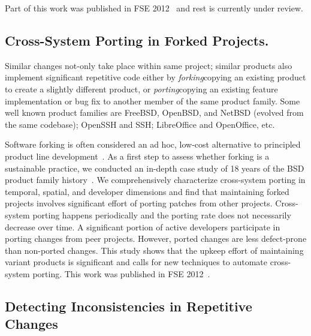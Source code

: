 \documentclass[a4paper, 11pt]{article}
\begin{document}
\begin{small}
\begin{itemize}
\end{itemize}

Part of this work was published in FSE 2012~\cite{Ray2012:RCP, Ray2012} and rest is currently under review.


\subsection*{\small Cross-System Porting in Forked Projects.}

Similar changes not-only take place within same project; similar products also implement significant repetitive code 
either by {\it forking}\textemdash copying an existing product to create a slightly different product, or 
{\it porting}\textemdash copying an existing feature implementation or bug fix to another member of the same product family. 
Some well known product families are FreeBSD, OpenBSD, and NetBSD (evolved from the same codebase);
OpenSSH and SSH; LibreOffice and OpenOffice, etc. 

Software forking is often considered an ad hoc, low-cost alternative to principled product line development~\cite{Raymond1999:CB}.
As a first step to assess whether forking is a sustainable practice, we conducted an in-depth case study of 18 years of the BSD product family 
history~\cite{Ray2012}. We comprehensively characterize cross-system porting in temporal, spatial, and developer dimensions and find that 
maintaining forked projects involves significant effort of porting patches from other projects. Cross-system porting happens periodically 
and the porting rate does not necessarily decrease over time. A significant portion of active developers participate in porting changes from peer projects. However, ported changes are less defect-prone than non-ported changes. This study shows that the upkeep effort of maintaining 
variant products is significant and calls for new techniques to automate cross-system porting. This work was published in FSE 2012~\cite{Ray2012}.

\subsection*{\small Detecting Inconsistencies in  Repetitive Changes}


\end{small}
\end{document}
